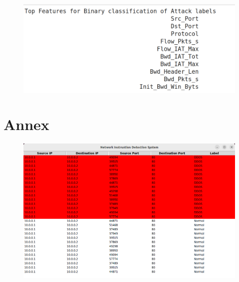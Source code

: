 \begin{figure}[tbh]
	\begin{center}
		\includegraphics[width=5in]{images/attlab.png}
	\end{center}
\end{figure}

\chapter*{Annex}
\begin{figure}[tbh]
	\begin{center}
		\includegraphics[width=5in]{images/annex.png}
	\end{center}
\end{figure}

